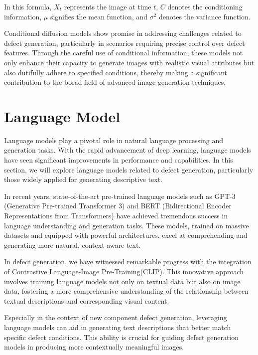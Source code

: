 In this formula, \(X_t\) represents the image at time \(t\), \(C\) denotes the conditioning information, \(\mu\) signifies the mean function, and \(\sigma^2\) denotes the variance function.

Conditional diffusion models show promise in addressing challenges related to defect generation, particularly in scenarios requiring precise control over defect features. Through the careful use of conditional information, these models not only enhance their capacity to generate images with realistic visual attributes but also dutifully adhere to specified conditions, thereby making a significant contribution to the borad field of advanced image generation techniques.

\section{Language Model }

Language models play a pivotal role in natural language processing and generation tasks. With the rapid advancement of deep learning, language models have seen significant improvements in performance and capabilities. In this section, we will explore language models related to defect generation, particularly those widely applied for generating descriptive text.

In recent years, state-of-the-art pre-trained language models such as GPT-3 (Generative Pre-trained Transformer 3)\cite{GPT3} and BERT (Bidirectional Encoder Representations from Transformers)\cite{BERT} have achieved tremendous success in language understanding and generation tasks. These models, trained on massive datasets and equipped with powerful architectures, excel at comprehending and generating more natural, context-aware text.

In defect generation, we have witnessed remarkable progress with the integration of Contrastive Language-Image Pre-Training(CLIP)\cite{CLIP}. This innovative approach involves training language models not only on textual data but also on image data, fostering a more comprehensive understanding of the relationship between textual descriptions and corresponding visual content. 

Especially in the context of new component defect generation, leveraging language models can aid in generating text descriptions that better match specific defect conditions. This ability is crucial for guiding defect generation models in producing more contextually meaningful images.

